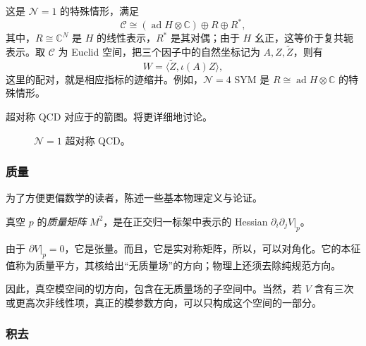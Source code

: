 \begin{example}[\texorpdfstring{$\mathcal{N}=2$}{N=2} 超对称 Yang--Mills 理论]\label{ex:5.23}
这是 $\mathcal{N}=1$ 的特殊情形，满足
\[
\mathcal{C}\cong(\operatorname{ad}H\otimes\mathbb{C})\oplus R\oplus R^*,
\]
其中，$R\cong\mathbb{C}^N$ 是 $H$ 的线性表示，$R^*$ 是其对偶；由于 $H$ 幺正，这等价于复共轭表示。取 $\mathcal{C}$ 为 Euclid 空间，把三个因子中的自然坐标记为 $A,Z,\widetilde Z$，则有
\[
W=\langle\widetilde Z,\iota(A)Z\rangle,
\]
这里的配对，就是相应指标的迹缩并。例如，$\mathcal{N}=4$ SYM 是 $R\cong\operatorname{ad}H\otimes\mathbb{C}$ 的特殊情形。
\end{example}

\begin{example}\label{ex:5.24}
超对称 QCD 对应于的箭图。将更详细地讨论。
\end{example}
\begin{figure}[H]
\centering
{}
\caption{$\mathcal{N}=1$ 超对称 QCD。}\label{fig:5.5}
\end{figure}

\subsubsection{质量}\label{sec:5.4.1.4}

为了方便更偏数学的读者，陈述一些基本物理定义与论证。
\begin{definition}\label{def:5.25}
真空 $p$ 的\emph{质量矩阵} $M^2$，是在正交归一标架中表示的 Hessian $\partial_i\partial_jV|_p$。
\end{definition}

由于 $\partial V|_p=0$，它是张量。而且，它是实对称矩阵，所以，可以对角化。它的本征值称为质量平方，其核给出“无质量场”的方向；物理上还须去除纯规范方向。

因此，真空模空间的切方向，包含在无质量场的子空间中。当然，若 $V$ 含有三次或更高次非线性项，真正的模参数方向，可以只构成这个空间的一部分。

\subsubsection{积去}\label{sec:5.4.1.5}

